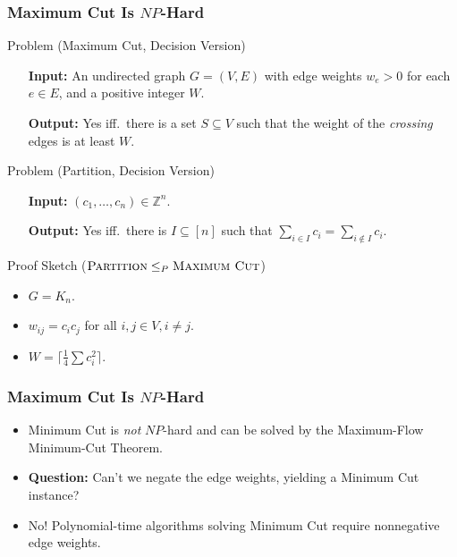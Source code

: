 \documentclass{beamer}
\newcommand{\ZZ}{\mathbb{Z}}
\begin{document}
    \begin{frame}
        \frametitle{{\sc Maximum Cut} Is $NP$-Hard}
    
        \begin{block}{Problem ({\sc Maximum Cut}, Decision Version)}
            \setlength{\leftmargini}{4em}
            \begin{itemize}
                \item[\bf Input:] An undirected graph $G = (V, E)$ with edge weights $w_e > 0$ for each $e \in E$, and a positive integer $W$.
                \item[\bf Output:] Yes iff.\ there is a set $S \subseteq V$ such that the weight of the \emph{crossing} edges is at least $W$.
            \end{itemize}
        \end{block}

        \pause

        \begin{block}{Problem ({\sc Partition}, Decision Version)}
            \setlength{\leftmargini}{4em}
            \begin{itemize}
                \item[\bf Input:] $(c_1, \ldots, c_n) \in \ZZ^n$.
                \item[\bf Output:] Yes iff.\ there is $I \subseteq [n]$ such that $\sum_{i \in I} c_i = \sum_{i \not \in I} c_i$.
            \end{itemize}
        \end{block}

        \pause

        \begin{block}{Proof Sketch ($\textsc{Partition} \leq_P \textsc{Maximum Cut}$)}
            \begin{itemize}
                \item $G = K_n$.
                \item $w_{ij} = c_i c_j$ for all $i, j \in V, i \neq j$.
                \item $W = \lceil \frac{1}{4} \sum c_i^2 \rceil$.
            \end{itemize}
        \end{block}
    \end{frame}

    \begin{frame}
        \frametitle{{\sc Maximum Cut} Is $NP$-Hard}
    
        \begin{itemize}
            \item {\sc Minimum Cut} is \emph{not} $NP$-hard and can be solved by the Maximum-Flow Minimum-Cut Theorem. \pause
            \item {\bf Question:} Can't we negate the edge weights, yielding a {\sc Minimum Cut} instance? \pause
            \item No! Polynomial-time algorithms solving {\sc Minimum Cut} require nonnegative edge weights.
        \end{itemize}
    \end{frame}
\end{document}

